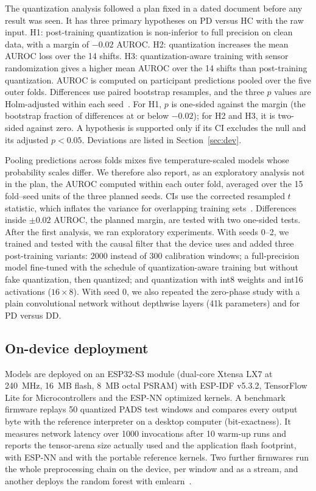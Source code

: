 \documentclass[preprint,12pt]{elsarticle}
\begin{document}
The quantization analysis followed a plan fixed in a dated document before any result was seen. It has three primary hypotheses on PD versus HC with the raw input. H1: post-training quantization is non-inferior to full precision on clean data, with a margin of $-0.02$ AUROC. H2: quantization increases the mean AUROC loss over the 14 shifts. H3: quantization-aware training with sensor randomization gives a higher mean AUROC over the 14 shifts than post-training quantization. AUROC is computed on participant predictions pooled over the five outer folds. Differences use paired bootstrap resamples, and the three $p$ values are Holm-adjusted within each seed~\cite{Holm1979}. For H1, $p$ is one-sided against the margin (the bootstrap fraction of differences at or below $-0.02$); for H2 and H3, it is two-sided against zero. A hypothesis is supported only if its CI excludes the null and its adjusted $p<0.05$. Deviations are listed in Section~\ref{sec:dev}.

Pooling predictions across folds mixes five temperature-scaled models whose probability scales differ. We therefore also report, as an exploratory analysis not in the plan, the AUROC computed within each outer fold, averaged over the 15 fold--seed units of the three planned seeds. CIs use the corrected resampled $t$ statistic, which inflates the variance for overlapping training sets~\cite{Nadeau2003}. Differences inside $\pm0.02$ AUROC, the planned margin, are tested with two one-sided tests. After the first analysis, we ran exploratory experiments. With seeds 0--2, we trained and tested with the causal filter that the device uses and added three post-training variants: 2000 instead of 300 calibration windows; a full-precision model fine-tuned with the schedule of quantization-aware training but without fake quantization, then quantized; and quantization with int8 weights and int16 activations ($16\times8$). With seed 0, we also repeated the zero-phase study with a plain convolutional network without depthwise layers (41k parameters) and for PD versus DD.

\subsection{On-device deployment}
\label{sec:device}
Models are deployed on an ESP32-S3 module (dual-core Xtensa LX7 at 240~MHz, 16~MB flash, 8~MB octal PSRAM) with ESP-IDF v5.3.2, TensorFlow Lite for Microcontrollers and the ESP-NN optimized kernels. A benchmark firmware replays 50 quantized PADS test windows and compares every output byte with the reference interpreter on a desktop computer (bit-exactness). It measures network latency over 1000 invocations after 10 warm-up runs and reports the tensor-arena size actually used and the application flash footprint, with ESP-NN and with the portable reference kernels. Two further firmwares run the whole preprocessing chain on the device, per window and as a stream, and another deploys the random forest with emlearn~\cite{emlearn}.
\end{document}
